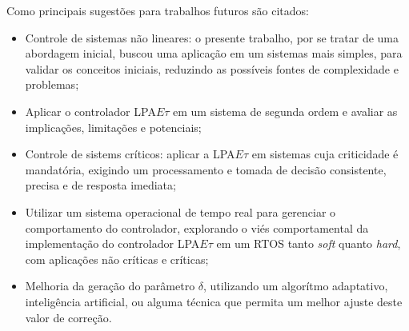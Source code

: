 Como principais sugestões para trabalhos futuros são citados:

\begin{itemize}

\item Controle de sistemas não lineares: o presente trabalho, por se tratar de uma abordagem inicial, buscou uma aplicação em um sistemas mais simples, para validar os conceitos iniciais, reduzindo as possíveis fontes de complexidade e problemas;

\item Aplicar o controlador LPA$E\tau$ em um sistema de segunda ordem e avaliar as implicações, limitações e potenciais;
  
\item Controle de sistems críticos: aplicar a LPA$E\tau$ em sistemas cuja criticidade é mandatória, exigindo um processamento e tomada de decisão consistente, precisa e de resposta imediata;

\item Utilizar um sistema operacional de tempo real para gerenciar o comportamento do controlador, explorando o viés comportamental da implementação do controlador LPA$E\tau$ em um RTOS tanto \emph{soft} quanto \emph{hard}, com aplicações não críticas e críticas;

  
\item Melhoria da geração do parâmetro $\delta$, utilizando um algorítmo adaptativo, inteligência artificial, ou alguma técnica que permita um melhor ajuste deste valor de correção.
  
\end{itemize}





